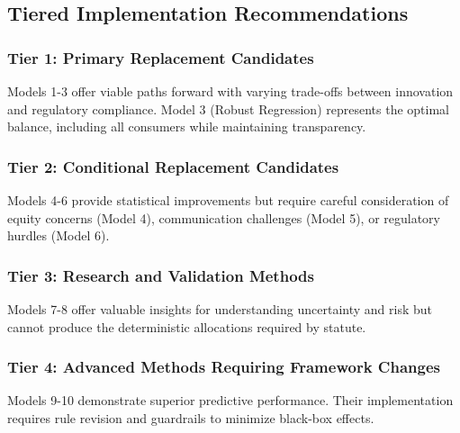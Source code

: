 \subsection{Tiered Implementation Recommendations}

\subsubsection{Tier 1: Primary Replacement Candidates}
Models 1-3 offer viable paths forward with varying trade-offs between innovation and regulatory compliance. Model 3 (Robust Regression) represents the optimal balance, including all consumers while maintaining transparency.

\subsubsection{Tier 2: Conditional Replacement Candidates}
Models 4-6 provide statistical improvements but require careful consideration of equity concerns (Model 4), communication challenges (Model 5), or regulatory hurdles (Model 6).

\subsubsection{Tier 3: Research and Validation Methods}
Models 7-8 offer valuable insights for understanding uncertainty and risk but cannot produce the deterministic allocations required by statute.

\subsubsection{Tier 4: Advanced Methods Requiring Framework Changes}
Models 9-10 demonstrate superior predictive performance. Their implementation requires rule revision and guardrails to minimize black-box effects.



